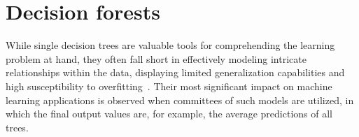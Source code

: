 


\section{Decision forests}
\label{sec:decision forests}

While single decision trees are valuable tools for comprehending the learning problem at hand, they often fall short in effectively modeling intricate relationships within the data, displaying limited generalization capabilities and high susceptibility to overfitting~\cite{breiman2001random,chen2016xgboost}.  %
%
Their most significant impact on machine learning applications is observed when committees of such models are utilized, in which the final output values
are, for example, the average predictions of all trees.


